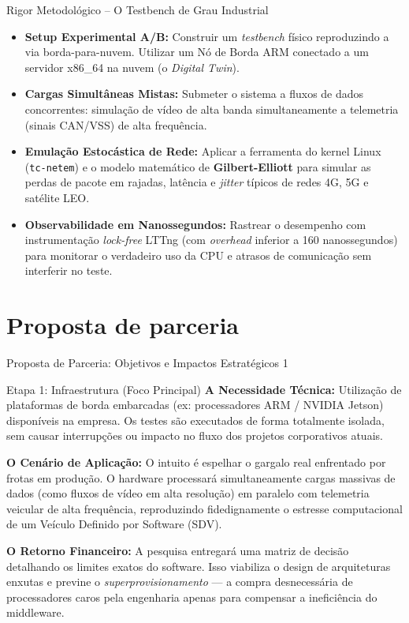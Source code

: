 \documentclass[aspectratio=169,xcolor=dvipsnames]{beamer}
\begin{document}
\begin{frame}{Rigor Metodológico -- O Testbench de Grau Industrial}
    \begin{itemize}
        \item \textbf{Setup Experimental A/B:} Construir um \textit{testbench} físico reproduzindo a via borda-para-nuvem. Utilizar um Nó de Borda ARM conectado a um servidor x86\_64 na nuvem (o \textit{Digital Twin}).
        \item \textbf{Cargas Simultâneas Mistas:} Submeter o sistema a fluxos de dados concorrentes: simulação de vídeo de alta banda simultaneamente a telemetria (sinais CAN/VSS) de alta frequência.
        \item \textbf{Emulação Estocástica de Rede:} Aplicar a ferramenta do kernel Linux (\texttt{tc-netem}) e o modelo matemático de \textbf{Gilbert-Elliott} para simular as perdas de pacote em rajadas, latência e \textit{jitter} típicos de redes 4G, 5G e satélite LEO.
        \item \textbf{Observabilidade em Nanossegundos:} Rastrear o desempenho com instrumentação \textit{lock-free} LTTng (com \textit{overhead} inferior a 160 nanossegundos) para monitorar o verdadeiro uso da CPU e atrasos de comunicação sem interferir no teste.
    \end{itemize}
\end{frame}

\section{Proposta de parceria}
\begin{frame}{Proposta de Parceria: Objetivos e Impactos Estratégicos 1}
    \begin{block}{Etapa 1: Infraestrutura (Foco Principal)}
        \small
        \textbf{A Necessidade Técnica:} Utilização de plataformas de borda embarcadas (ex: processadores ARM / NVIDIA Jetson) disponíveis na empresa. Os testes são executados de forma totalmente isolada, sem causar interrupções ou impacto no fluxo dos projetos corporativos atuais.\\ \vspace{1.2ex}

        \textbf{O Cenário de Aplicação:} O intuito é espelhar o gargalo real enfrentado por frotas em produção. O hardware processará simultaneamente cargas massivas de dados (como fluxos de vídeo em alta resolução) em paralelo com telemetria veicular de alta frequência, reproduzindo fidedignamente o estresse computacional de um Veículo Definido por Software (SDV).\\ \vspace{1.2ex}

        \textbf{O Retorno Financeiro:} A pesquisa entregará uma matriz de decisão detalhando os limites exatos do software. Isso viabiliza o design de arquiteturas enxutas e previne o \textit{superprovisionamento} — a compra desnecessária de processadores caros pela engenharia apenas para compensar a ineficiência do middleware.
    \end{block}
\end{frame}
\end{document}
